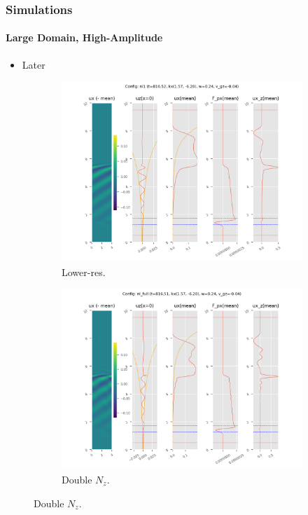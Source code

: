 \documentclass[dvipsnames, 10pt]{beamer}
\begin{document}
\begin{frame}
    \frametitle{Simulations}
    \framesubtitle{Large Domain, High-Amplitude}

    \begin{itemize}
        \item Later
    \end{itemize}

    \begin{figure}[t]
        \centering
        \hspace*{-19mm}%
        \begin{subfigure}{0.53\textwidth}
            \centering
            \includegraphics[width=\textwidth]{nl_low_2.png}
            \caption{Lower-res.}
        \end{subfigure}
        \begin{subfigure}{0.53\textwidth}
            \centering
            \includegraphics[width=\textwidth]{nl_full_2.png}
            \caption{Double $N_z$.}
        \end{subfigure}
        \hspace*{-19mm}%
    \end{figure}
\end{frame}
\end{document}
